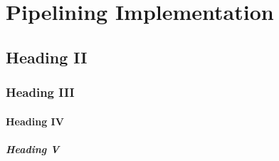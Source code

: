 \section{Pipelining Implementation}



\subsection{Heading II}
\subsubsection{Heading III}
\paragraph{Heading IV}
\subparagraph{Heading V}

